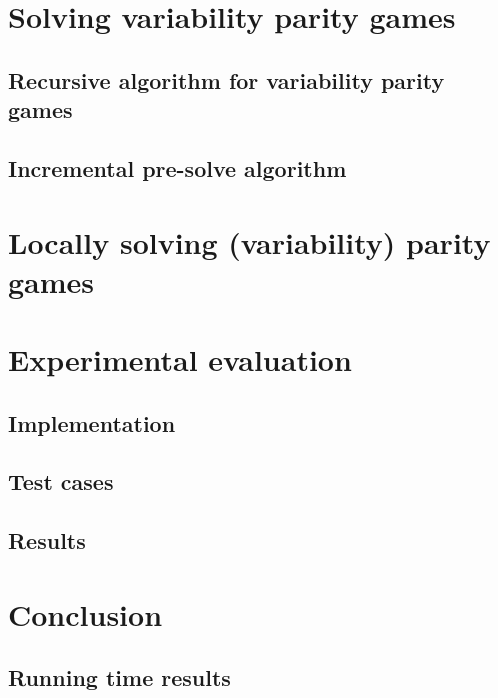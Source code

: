 \documentclass[]{article}
\theoremstyle{definition}
\begin{document}
\pagebreak
\section{Solving variability parity games}


\subsection{Recursive algorithm for variability parity games}


\subsection{Incremental pre-solve algorithm}


\pagebreak
\section{Locally solving (variability) parity games}


\pagebreak
\section{Experimental evaluation}


\subsection{Implementation}


\subsection{Test cases}


\subsection{Results}


\pagebreak
\section{Conclusion}


\pagebreak
\begin{appendices}
\section{Running time results}
\label{appendix:resultsexact}

\end{appendices}

\pagebreak

 
\end{document}
